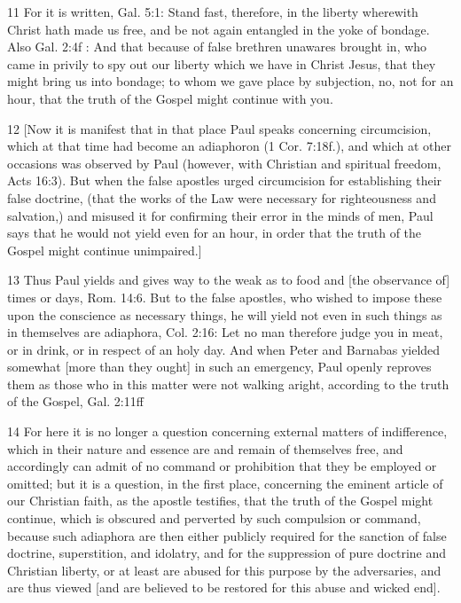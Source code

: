 {11 For it is written, Gal. 5:1: Stand fast, therefore, in the liberty wherewith Christ hath made us free, and be not again entangled in the yoke of bondage. Also Gal. 2:4f : And that because of false brethren unawares brought in, who came in privily to spy out our liberty which we have in Christ Jesus, that they might bring us into bondage; to whom we gave place by subjection, no, not for an hour, that the truth of the Gospel might continue with you.

12 [Now it is manifest that in that place Paul speaks concerning circumcision, which at that time had become an adiaphoron (1 Cor. 7:18f.), and which at other occasions was observed by Paul (however, with Christian and spiritual freedom, Acts 16:3). But when the false apostles urged circumcision for establishing their false doctrine, (that the works of the Law were necessary for righteousness and salvation,) and misused it for confirming their error in the minds of men, Paul says that he would not yield even for an hour, in order that the truth of the Gospel might continue unimpaired.]

13 Thus Paul yields and gives way to the weak as to food and [the observance of] times or days, Rom. 14:6. But to the false apostles, who wished to impose these upon the conscience as necessary things, he will yield not even in such things as in themselves are adiaphora, Col. 2:16: Let no man therefore judge you in meat, or in drink, or in respect of an holy day. And when Peter and Barnabas yielded somewhat [more than they ought] in such an emergency, Paul openly reproves them as those who in this matter were not walking aright, according to the truth of the Gospel, Gal. 2:11ff

14 For here it is no longer a question concerning external matters of indifference, which in their nature and essence are and remain of themselves free, and accordingly can admit of no command or prohibition that they be employed or omitted; but it is a question, in the first place, concerning the eminent article of our Christian faith, as the apostle testifies, that the truth of the Gospel might continue, which is obscured and perverted by such compulsion or command, because such adiaphora are then either publicly required for the sanction of false doctrine, superstition, and idolatry, and for the suppression of pure doctrine and Christian liberty, or at least are abused for this purpose by the adversaries, and are thus viewed [and are believed to be restored for this abuse and wicked end].

}
